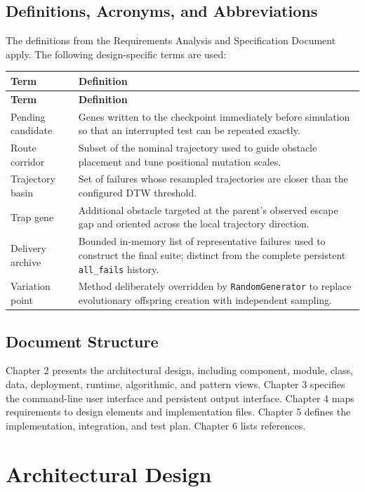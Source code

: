 \documentclass[11pt,a4paper,openany]{report}
\newcommand{\code}[1]{\texttt{#1}}
\begin{document}
\section{Definitions, Acronyms, and Abbreviations}
The definitions from the Requirements Analysis and Specification Document apply. The following design-specific terms are used:
\begin{longtable}{L{3.4cm} L{11.4cm}}
\toprule
\textbf{Term} & \textbf{Definition}\\
\midrule
\endfirsthead
\toprule
\textbf{Term} & \textbf{Definition}\\
\midrule
\endhead
Pending candidate & Genes written to the checkpoint immediately before simulation so that an interrupted test can be repeated exactly.\\
Route corridor & Subset of the nominal trajectory used to guide obstacle placement and tune positional mutation scales.\\
Trajectory basin & Set of failures whose resampled trajectories are closer than the configured DTW threshold.\\
Trap gene & Additional obstacle targeted at the parent's observed escape gap and oriented across the local trajectory direction.\\
Delivery archive & Bounded in-memory list of representative failures used to construct the final suite; distinct from the complete persistent \texttt{all\_fails} history.\\
Variation point & Method deliberately overridden by \code{RandomGenerator} to replace evolutionary offspring creation with independent sampling.\\
\bottomrule
\end{longtable}

\section{Document Structure}
Chapter 2 presents the architectural design, including component, module, class, data, deployment, runtime, algorithmic, and pattern views. Chapter 3 specifies the command-line user interface and persistent output interface. Chapter 4 maps requirements to design elements and implementation files. Chapter 5 defines the implementation, integration, and test plan. Chapter 6 lists references.

\chapter{Architectural Design}
\end{document}
